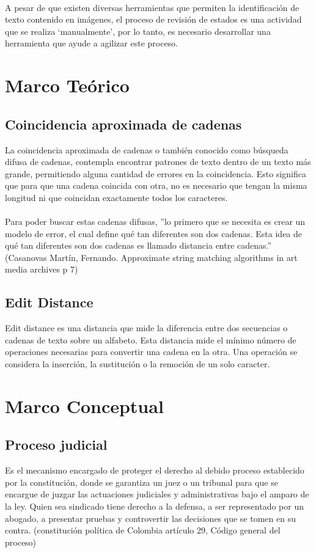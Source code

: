 \paragraph{}
A pesar de que existen diversas herramientas que permiten la identificaci\'on
de texto contenido en im\'agenes, el proceso de revisi\'on de estados es 
una actividad que se realiza ‘manualmente’, por lo tanto, es necesario 
desarrollar una herramienta que ayude a agilizar este proceso.

\section{Marco Te\'orico}
\subsection{Coincidencia aproximada de cadenas}
La coincidencia aproximada de cadenas o tambi\'en conocido como b\'usqueda 
difusa de cadenas, contempla encontrar patrones de texto dentro de un 
texto m\'as grande, permitiendo alguna cantidad de errores en la coincidencia.
Esto significa que para que una cadena coincida con otra, no es necesario
que tengan la misma longitud ni que coincidan exactamente todos los 
caracteres.
\paragraph{}
Para poder buscar estas cadenas difusas, 
''lo primero que se necesita es crear un modelo de error, el cual define qu\'e tan diferentes son dos cadenas. Esta idea de qu\'e tan diferentes son dos cadenas es llamado distancia entre cadenas.'' (Casanovas Mart\'in, Fernando. Approximate string matching algorithms in art media archives p 7)

\subsection{Edit Distance}
Edit distance es una distancia que mide la diferencia entre dos 
secuencias o cadenas de texto sobre un alfabeto. Esta distancia mide el
m\'inimo n\'umero de operaciones necesarias para convertir una cadena en la
otra. Una operaci\'on se considera la inserci\'on, la sustituci\'on o la 
remoci\'on de un solo caracter.

\section{Marco Conceptual}
\subsection{Proceso judicial}
Es el mecanismo encargado de proteger el derecho al debido proceso 
establecido por la constituci\'on, donde se garantiza un juez o un 
tribunal para que se encargue de juzgar las actuaciones judiciales y 
administrativas bajo el amparo de la ley. Quien sea sindicado tiene 
derecho a la defensa, a ser representado por un abogado, a presentar 
pruebas y controvertir las decisiones que se tomen en su contra.
(constituci\'on pol\'itica de Colombia art\'iculo 29, C\'odigo general del proceso)


